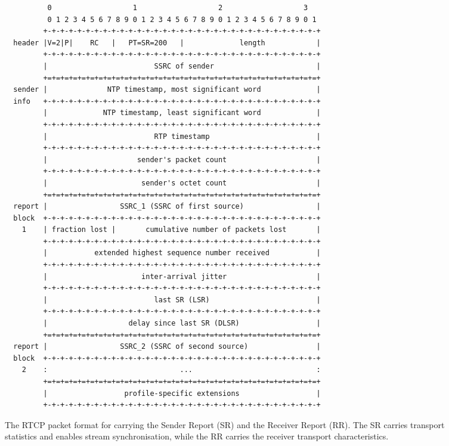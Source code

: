 \begin{figure}[!t]
\begin{spacing}{0.5}
{\footnotesize
\begin{verbatim}
          0                   1                   2                   3
          0 1 2 3 4 5 6 7 8 9 0 1 2 3 4 5 6 7 8 9 0 1 2 3 4 5 6 7 8 9 0 1
         +-+-+-+-+-+-+-+-+-+-+-+-+-+-+-+-+-+-+-+-+-+-+-+-+-+-+-+-+-+-+-+-+
  header |V=2|P|    RC   |   PT=SR=200   |             length            |
         +-+-+-+-+-+-+-+-+-+-+-+-+-+-+-+-+-+-+-+-+-+-+-+-+-+-+-+-+-+-+-+-+
         |                         SSRC of sender                        |
         +=+=+=+=+=+=+=+=+=+=+=+=+=+=+=+=+=+=+=+=+=+=+=+=+=+=+=+=+=+=+=+=+
  sender |              NTP timestamp, most significant word             |
  info   +-+-+-+-+-+-+-+-+-+-+-+-+-+-+-+-+-+-+-+-+-+-+-+-+-+-+-+-+-+-+-+-+
         |             NTP timestamp, least significant word             |
         +-+-+-+-+-+-+-+-+-+-+-+-+-+-+-+-+-+-+-+-+-+-+-+-+-+-+-+-+-+-+-+-+
         |                         RTP timestamp                         |
         +-+-+-+-+-+-+-+-+-+-+-+-+-+-+-+-+-+-+-+-+-+-+-+-+-+-+-+-+-+-+-+-+
         |                     sender's packet count                     |
         +-+-+-+-+-+-+-+-+-+-+-+-+-+-+-+-+-+-+-+-+-+-+-+-+-+-+-+-+-+-+-+-+
         |                      sender's octet count                     |
         +=+=+=+=+=+=+=+=+=+=+=+=+=+=+=+=+=+=+=+=+=+=+=+=+=+=+=+=+=+=+=+=+
  report |                 SSRC_1 (SSRC of first source)                 |
  block  +-+-+-+-+-+-+-+-+-+-+-+-+-+-+-+-+-+-+-+-+-+-+-+-+-+-+-+-+-+-+-+-+
    1    | fraction lost |       cumulative number of packets lost       |
         +-+-+-+-+-+-+-+-+-+-+-+-+-+-+-+-+-+-+-+-+-+-+-+-+-+-+-+-+-+-+-+-+
         |           extended highest sequence number received           |
         +-+-+-+-+-+-+-+-+-+-+-+-+-+-+-+-+-+-+-+-+-+-+-+-+-+-+-+-+-+-+-+-+
         |                      inter-arrival jitter                     |
         +-+-+-+-+-+-+-+-+-+-+-+-+-+-+-+-+-+-+-+-+-+-+-+-+-+-+-+-+-+-+-+-+
         |                         last SR (LSR)                         |
         +-+-+-+-+-+-+-+-+-+-+-+-+-+-+-+-+-+-+-+-+-+-+-+-+-+-+-+-+-+-+-+-+
         |                   delay since last SR (DLSR)                  |
         +=+=+=+=+=+=+=+=+=+=+=+=+=+=+=+=+=+=+=+=+=+=+=+=+=+=+=+=+=+=+=+=+
  report |                 SSRC_2 (SSRC of second source)                |
  block  +-+-+-+-+-+-+-+-+-+-+-+-+-+-+-+-+-+-+-+-+-+-+-+-+-+-+-+-+-+-+-+-+
    2    :                               ...                             :
         +=+=+=+=+=+=+=+=+=+=+=+=+=+=+=+=+=+=+=+=+=+=+=+=+=+=+=+=+=+=+=+=+
         |                  profile-specific extensions                  |
         +-+-+-+-+-+-+-+-+-+-+-+-+-+-+-+-+-+-+-+-+-+-+-+-+-+-+-+-+-+-+-+-+
\end{verbatim}
}
\end{spacing}
\caption{The RTCP packet format for carrying the Sender Report (SR) and
the Receiver Report (RR). The SR carries transport statistics and enables 
stream synchronisation, while the RR carries the receiver transport 
characteristics.}
\label{fig:3:rtcp.hdr}
\end{figure}

